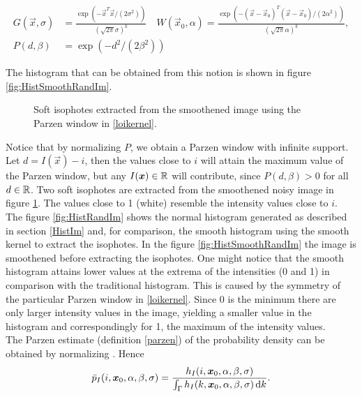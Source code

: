 \begin{equation}
  \begin{split}
    G(\vec{x},\sigma) &= \frac{\exp(-\vec{x}^T\vec{x}/(2\sigma^2))}{(\sqrt{2\pi}\sigma)^{k}}\quad W(\vec{x}_0,\alpha) = \frac{\exp(-(\vec{x}-\vec{x}_0)^T(\vec{x}-\vec{x}_0)/(2\alpha^2))}{(\sqrt{2\pi}\alpha)^{k}},\\
    P(d,\beta) &= \exp(-d^2/(2\beta^2))
  \end{split}\label{loikernel}
\end{equation}

The histogram that can be obtained from this notion is shown in figure \ref{fig:HistSmoothRandIm}.

\begin{figure}
  \centering
  \quad
  \caption{Soft isophotes extracted from the smoothened image using the Parzen window in \eqref{loikernel}.}\label{fig:SoftIso}
\end{figure}

Notice that by normalizing $P$, we obtain a Parzen window with infinite support. Let $d=I(\vec{x})-i$, then the values close to $i$ will attain the maximum value of the Parzen window, but any $I(\boldsymbol{x} )\in \mathbb R$ will contribute, since $P(d,\beta)>0$ for all $d\in\mathbb R$. Two soft isophotes are extracted from the smoothened noisy image in figure \ref{fig:SoftIso}. The values close to 1 (white) resemble the intensity values close to $i$.\\
The figure \ref{fig:HistRandIm} shows the normal histogram generated as described in section \ref{HistIm} and, for comparison, the smooth histogram using the smooth kernel to extract the isophotes. In the figure \ref{fig:HistSmoothRandIm} the image is smoothened before extracting the isophotes. One might notice that the smooth histogram attains lower values at the extrema of the intensities (0 and 1) in comparison with the traditional histogram. This is caused by the symmetry of the particular Parzen window in \eqref{loikernel}. Since 0 is the minimum there are only larger intensity values in the image, yielding a smaller value in the histogram and correspondingly for 1, the maximum of the intensity values.\\

The Parzen estimate (definition \ref{parzen}) of the probability density can be obtained by normalizing \cite{dar.11}. Hence
\begin{equation}
\bar{p}_I(i,\boldsymbol{x} _0,\alpha,\beta,\sigma) = \frac{h_I(i,\boldsymbol{x} _0,\alpha,\beta,\sigma)}{\int_\Gamma h_I(k,\boldsymbol{x} _0,\alpha,\beta,\sigma)\,{\rm d} k}.
\end{equation}

